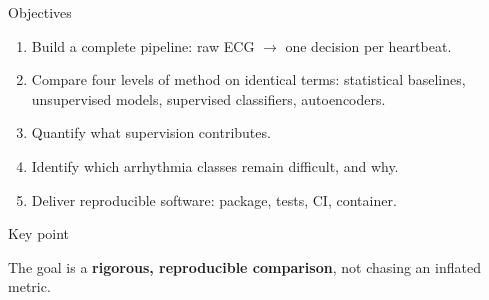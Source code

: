 \documentclass[aspectratio=169,10pt]{beamer}
\newcommand{\keypoint}[1]{%
  \vspace{0.4em}
  \begin{alertblock}{Key point}
    #1
  \end{alertblock}
}
\begin{document}
\begin{frame}{Objectives}

  \begin{enumerate}
    \item Build a complete pipeline: raw ECG $\rightarrow$ one decision per heartbeat.
    \item Compare four levels of method on identical terms:
      statistical baselines, unsupervised models, supervised classifiers, autoencoders.
    \item Quantify what supervision contributes.
    \item Identify which arrhythmia classes remain difficult, and why.
    \item Deliver reproducible software: package, tests, CI, container.
  \end{enumerate}

  \keypoint{
    \vspace{0.1cm}
    The goal is a \textbf{rigorous, reproducible comparison}, not chasing an inflated metric.}

\end{frame}
\end{document}
